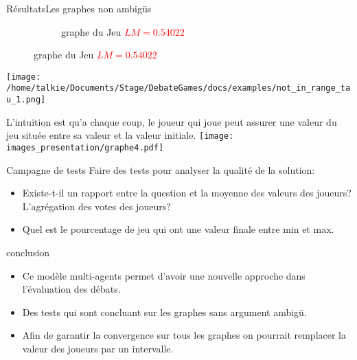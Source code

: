 \documentclass{beamer}
\begin{document}
\begin{frame}{Résultats}{Les graphes non ambigüs}
\begin{overprint}
\begin{figure}
\begin{subfigure}{.45\linewidth}
          \caption {graphe du Jeu \textcolor{red}{$LM = 0.54022$}}
        \end{subfigure}
        \end{figure}


      \begin{center}
        \texttt{[image: /home/talkie/Documents/Stage/DebateGames/docs/examples/not\_in\_range\_tau\_1.png]}
      \end{center}


      L'intuition est qu'a chaque coup, le joueur qui joue peut assurer une valeur du jeu située entre sa valeur et la valeur initiale.
      \texttt{[image: images\_presentation/graphe4.pdf]}

    \end{overprint}
  \end{frame}

  \begin{frame}{Campagne de tests}
    Faire des tests pour analyser la qualité de la solution:
    \begin{itemize}
      \item Existe-t-il un rapport entre la question et la moyenne des valeurs des joueurs? L'agrégation des votes des joueurs?
      \item Quel est le pourcentage de jeu qui ont une valeur finale entre min et max.

    \end{itemize}
  \end{frame}

  \begin{frame}{conclusion}
    \begin{itemize}
      \item Ce modèle multi-agents permet d'avoir une nouvelle approche dans l'évaluation des débats.
      \item Des tests qui sont concluant sur les graphes sans argument ambigü.
      \item Afin de garantir la convergence sur tous les graphes on pourrait remplacer la valeur des joueurs par un intervalle.
    \end{itemize}
  \end{frame}
\end{document}
